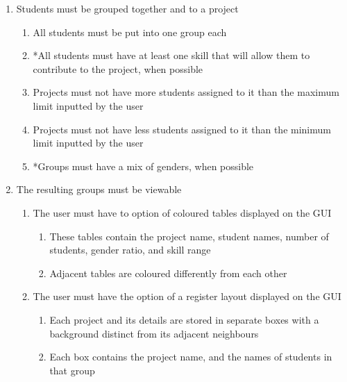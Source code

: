\documentclass{article}
\begin{document}
\begin{enumerate}
\begin{enumerate}
\begin{enumerate}
                \item Size of populations must be a positive integer greater than or equal to 4
            \end{enumerate}
            \item Project and student data can be edited and removed
            \item At least one student, at least one project, target fitness, max iterations, and size of populations must all be entered/have values before the algorithm is run
        \end{enumerate}
    \item Students must be grouped together and to a project
        \begin{enumerate}
            \item All students must be put into one group each
            \item *All students must have at least one skill that will allow them to contribute to the project, when possible
            \item Projects must not have more students assigned to it than the maximum limit inputted by the user
            \item Projects must not have less students assigned to it than the minimum limit inputted by the user
            \item *Groups must have a mix of genders, when possible
        \end{enumerate}
    \item The resulting groups must be viewable
        \begin{enumerate}
            \item The user must have to option of coloured tables displayed on the GUI 
            \begin{enumerate}
                \item These tables contain the project name, student names, number of students, gender ratio, and skill range
                \item Adjacent tables are coloured differently from each other
            \end{enumerate} 
            \item The user must have the option of a register layout displayed on the GUI
            \begin{enumerate}
                \item Each project and its details are stored in separate boxes with a background distinct from its adjacent neighbours
                \item Each box contains the project name, and the names of students in that group

\end{enumerate}
\end{enumerate}
\end{enumerate}
\end{document}
